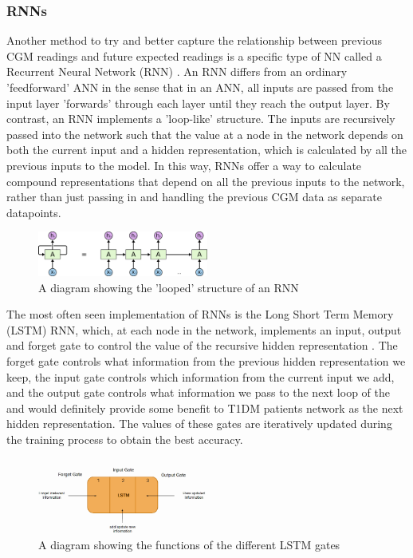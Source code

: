       \subsubsection{RNNs}
      Another method to try and better capture the relationship between previous CGM readings and future expected readings is a specific type of NN called a Recurrent Neural Network (RNN) \cite{whatisrnn}. An RNN differs from an ordinary 'feedforward' ANN in the sense that in an ANN, all inputs are passed from the input layer 'forwards' through each layer until they reach the output layer. By contrast, an RNN implements a 'loop-like' structure. The inputs are recursively passed into the network such that the value at a node in the network depends on both the current input and a hidden representation, which is calculated by all the previous inputs to the model. In this way, RNNs offer a way to calculate compound representations that depend on all the previous inputs to the network, rather than just passing in and handling the previous CGM data as separate datapoints. 
      \begin{figure}[H]
        \centering
        \includegraphics[width=0.5\textwidth]{images/basicRNN.png}
        \caption{
         A diagram showing the 'looped' structure of an RNN \cite{whatisrnnimage}
        }
      \end{figure}
      The most often seen implementation of RNNs is the Long Short Term Memory (LSTM) RNN, which, at each node in the network, implements an input, output and forget gate to control the value of the recursive hidden representation \cite{lstminfo}. The forget gate controls what information from the previous hidden representation we keep, the input gate controls which information from the current input we add, and the output gate controls what information we pass to the next loop of the and would definitely provide some benefit to T1DM patients network as the next hidden representation. The values of these gates are iteratively updated during the training process to obtain the best accuracy. 
      \begin{figure}[H]
        \centering
        \includegraphics[width=0.5\textwidth]{images/basicLSTM.png}
        \caption{
         A diagram showing the functions of the different LSTM gates \cite{lstminfo}
        }
      \end{figure}
